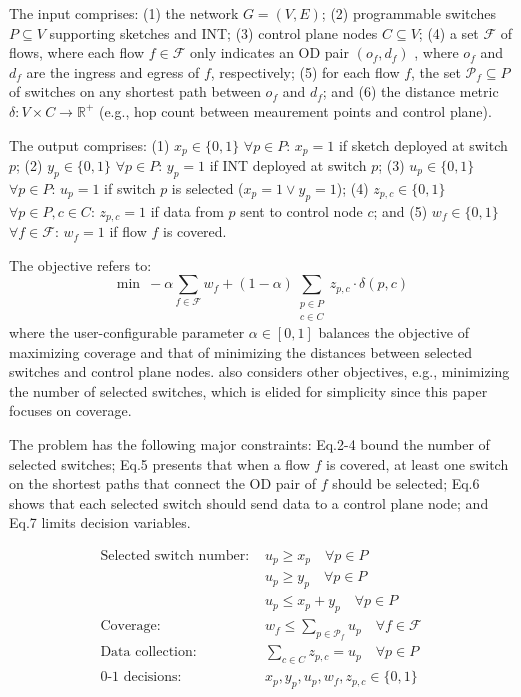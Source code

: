  The input comprises:
(1) the network $G = (V, E)$;
(2) programmable switches $P \subseteq V$ supporting sketches and INT;
(3) control plane nodes $C \subseteq V$;
(4) a set $\mathcal{F}$ of flows, where each flow $f \in \mathcal{F}$ only indicates an OD pair $(o_f, d_f)$ \cite{liu2016one,anup2022hetero}, where $o_f$ and $d_f$ are the ingress and egress of $f$, respectively; 
(5) for each flow $f$, the set $\mathcal{P}_f \subseteq P$ of switches on any shortest path between $o_f$ and $d_f$;
and (6) the distance metric $\delta: V \times C \to \mathbb{R}^+$ (e.g., hop count between meaurement points and control plane).

 The output comprises:
(1) $x_p \in \{0,1\}$ $\forall p \in P$: $x_p=1$ if sketch deployed at switch $p$;
(2) $y_p \in \{0,1\}$ $\forall p \in P$: $y_p=1$ if INT deployed at switch $p$;
(3) $u_p \in \{0,1\}$ $\forall p \in P$: $u_p=1$ if switch $p$ is selected ($x_p =1 \lor y_p=1$);
(4) $z_{p,c} \in \{0,1\}$ $\forall p \in P, c \in C$: $z_{p,c}=1$ if data from $p$ sent to control node $c$;
and (5) $w_f \in \{0,1\}$ $\forall f \in \mathcal{F}$: $w_f=1$ if flow $f$ is covered.

 The objective refers to:
\begin{equation}
\min\ -\alpha \sum_{f \in \mathcal{F}} w_f + (1-\alpha) \sum_{\substack{p \in P \\ c \in C}} z_{p,c} \cdot \delta(p, c)
\label{eq:objective}
\end{equation}
where the user-configurable parameter $\alpha \in [0,1]$ balances the objective of maximizing coverage and that of minimizing the distances between selected switches and control plane nodes. 
\sysname also considers other objectives, e.g., minimizing the number of selected switches, which is elided for simplicity since this paper focuses on coverage. 

 The problem has the following major constraints: Eq.2-4 bound the number of selected switches; Eq.5 presents that when a flow $f$ is covered, at least one switch on the shortest paths that connect the OD pair of $f$ should be selected; Eq.6 shows that each selected switch should send data to a control plane node; and Eq.7 limits decision variables. 

\vspace{-7pt}
{\footnotesize
\begin{align}
\text{Selected switch number: } &u_p \geq x_p \quad \forall p \in P \\
&u_p \geq y_p \quad \forall p \in P \\
&u_p \leq x_p + y_p \quad \forall p \in P \\
\text{Coverage: } &w_f \leq \sum_{p \in \mathcal{P}_f} u_p \quad \forall f \in \mathcal{F} \\
\text{Data collection: } &\sum_{c \in C} z_{p,c} = u_p \quad \forall p \in P \\
\text{0-1 decisions: } &x_p, y_p, u_p, w_f, z_{p,c} \in \{0,1\}
\end{align}}


